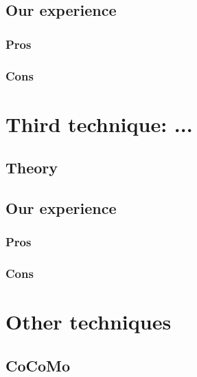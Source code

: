 \subsection{Our experience}

\subsubsection{Pros}

\subsubsection{Cons}

\section{Third technique: ...}
\subsection{Theory}

\subsection{Our experience}

\subsubsection{Pros}

\subsubsection{Cons}

\section{Other techniques}
\subsection{CoCoMo}